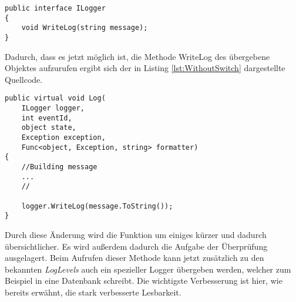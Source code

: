 \begin{lstlisting}[language={[Sharp]C}, caption=Beispiele für ein Log Interface, label=lst:LogInterface]
public interface ILogger
{
	void WriteLog(string message);
}
\end{lstlisting}

\SuperPar Dadurch, dass es jetzt möglich ist, die Methode WriteLog des übergebene Objektes aufzurufen ergibt sich der in Listing \ref{lst:WithoutSwitch} dargestellte Quellcode.

\begin{lstlisting}[language={[Sharp]C}, caption=Beispiele für Switch Statement; label=lst:SwitchStatement]
public virtual void Log(
	ILogger logger,
	int eventId,
	object state,
	Exception exception,
	Func<object, Exception, string> formatter)
{
	//Building message
	...
	//

	logger.WriteLog(message.ToString());
}
\end{lstlisting}

\SuperPar Durch diese Änderung wird die Funktion um einiges kürzer und dadurch übersichtlicher. Es wird außerdem dadurch die Aufgabe der Überprüfung ausgelagert. Beim Aufrufen dieser Methode kann jetzt zusätzlich zu den bekannten \textit{LogLevels} auch ein spezieller Logger übergeben werden, welcher zum Beispiel in eine Datenbank schreibt. Die wichtigste Verbesserung ist hier, wie bereits erwähnt, die stark verbesserte Lesbarkeit. 

